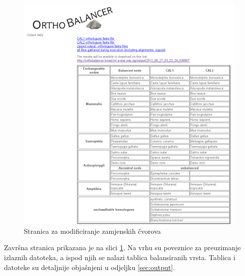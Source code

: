 \begin{figure}[h!]
\centering
\includegraphics[width=5.8in]{figures/output-html.png}
\caption{Stranica za modificiranje zamjenskih čvorova}
\label{fig:output-html}
\end{figure} 
 
Završna stranica prikazana je na slici \ref{fig:output-html}. Na vrhu su
poveznice za preuzimanje izlaznih datoteka, a ispod njih se nalazi tablica
balansiranih vrsta. Tablica i datoteke su detaljnije objašnjeni u odjeljku
\ref{sec:output}.
